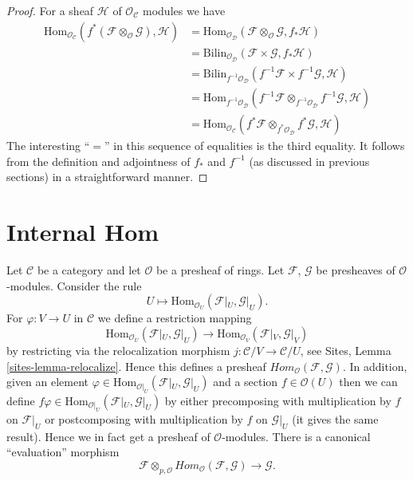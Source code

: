 \begin{proof}
For a sheaf $\mathcal{H}$ of $\mathcal{O}_{\mathcal{C}}$ modules we
have
\begin{align*}
\text{Hom}_{\mathcal{O}_{\mathcal{C}}}(
f^*(\mathcal{F} \otimes_{\mathcal{O}} \mathcal{G}), \mathcal{H})
& =
\text{Hom}_{\mathcal{O}_{\mathcal{D}}}(
\mathcal{F} \otimes_{\mathcal{O}} \mathcal{G}, f_*\mathcal{H}) \\
& =
\text{Bilin}_{\mathcal{O}_{\mathcal{D}}}(
\mathcal{F} \times \mathcal{G}, f_*\mathcal{H}) \\
& =
\text{Bilin}_{f^{-1}\mathcal{O}_{\mathcal{D}}}(
f^{-1}\mathcal{F} \times f^{-1}\mathcal{G}, \mathcal{H}) \\
& =
\text{Hom}_{f^{-1}\mathcal{O}_{\mathcal{D}}}(
f^{-1}\mathcal{F} \otimes_{f^{-1}\mathcal{O}_{\mathcal{D}}} f^{-1}\mathcal{G},
\mathcal{H}) \\
& =
\text{Hom}_{\mathcal{O}_{\mathcal{C}}}(
f^*\mathcal{F} \otimes_{f^*\mathcal{O}_{\mathcal{D}}} f^*\mathcal{G},
\mathcal{H})
\end{align*}
The interesting ``$=$'' in this sequence of equalities is the 
third equality. It follows from the definition and adjointness of
$f_*$ and $f^{-1}$ (as discussed in previous sections) in a
straightforward manner.
\end{proof}



\section{Internal Hom}
\label{section-internal-hom}

\noindent
Let $\mathcal{C}$ be a category and let $\mathcal{O}$ be a presheaf
of rings. Let $\mathcal{F}$, $\mathcal{G}$ be presheaves of
$\mathcal{O}$-modules. Consider the rule
$$
U \longmapsto \text{Hom}_{\mathcal{O}_U}(\mathcal{F}|_U, \mathcal{G}|_U).
$$
For $\varphi : V \to U$ in $\mathcal{C}$ we define a restriction mapping
$$
\text{Hom}_{\mathcal{O}_U}(\mathcal{F}|_U, \mathcal{G}|_U)
\longrightarrow
\text{Hom}_{\mathcal{O}_V}(\mathcal{F}|_V, \mathcal{G}|_V)
$$
by restricting via the relocalization morphism
$j : \mathcal{C}/V \to \mathcal{C}/U$, see
Sites, Lemma \ref{sites-lemma-relocalize}. Hence this defines a
presheaf $\textit{Hom}_{\mathcal{O}}(\mathcal{F}, \mathcal{G})$.
In addition, given an element
$\varphi \in \text{Hom}_{\mathcal{O}|_U}(\mathcal{F}|_U, \mathcal{G}|_U)$
and a section $f \in \mathcal{O}(U)$ then we can define
$f\varphi \in \text{Hom}_{\mathcal{O}|_U}(\mathcal{F}|_U, \mathcal{G}|_U)$
by either precomposing with multiplication by $f$ on $\mathcal{F}|_U$
or postcomposing with multiplication by $f$ on $\mathcal{G}|_U$ (it gives
the same result). Hence we in fact get a presheaf of $\mathcal{O}$-modules.
There is a canonical ``evaluation'' morphism
$$
\mathcal{F}
\otimes_{p, \mathcal{O}}
\textit{Hom}_{\mathcal{O}}(\mathcal{F}, \mathcal{G})
\longrightarrow
\mathcal{G}.
$$

